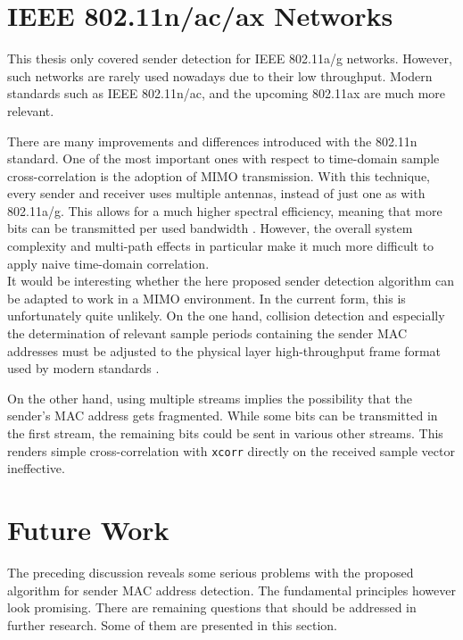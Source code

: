 
\section{IEEE 802.11n/ac/ax Networks}\label{sec:mimo}

This thesis only covered sender detection for IEEE 802.11a/g networks. However, such networks are rarely used nowadays due to their low throughput. Modern standards such as IEEE 802.11n/ac, and the upcoming 802.11ax are much more relevant.

There are many improvements and differences introduced with the 802.11n standard. One of the most important ones with respect to time-domain sample cross-correlation is the adoption of \gls{MIMO} transmission. With this technique, every sender and receiver uses multiple antennas, instead of just one as with 802.11a/g. This allows for a much higher spectral efficiency, meaning that more bits can be transmitted per used bandwidth \cite{perahia2013}. However, the overall system complexity and multi-path effects in particular make it much more difficult to apply naive time-domain correlation.\\

It would be interesting whether the here proposed sender detection algorithm can be adapted to work in a \gls{MIMO} environment. In the current form, this is unfortunately quite unlikely. On the one hand, collision detection and especially the determination of relevant sample periods containing the sender \gls{MAC} addresses must be adjusted to the physical layer high-throughput frame format used by modern standards \cite{ieee2012}.

On the other hand, using multiple streams implies the possibility that the sender's \gls{MAC} address gets fragmented. While some bits can be transmitted in the first stream, the remaining bits could be sent in various other streams. This renders simple cross-correlation with \texttt{xcorr} directly on the received sample vector ineffective.



\section{Future Work}

The preceding discussion reveals some serious problems with the proposed algorithm for sender \gls{MAC} address detection. The fundamental principles however look promising. There are remaining questions that should be addressed in further research. Some of them are presented in this section.\\

